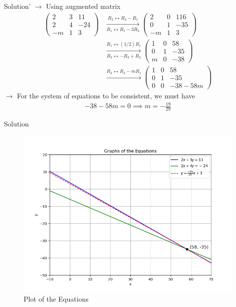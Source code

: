 \documentclass{beamer}
\numberwithin{equation}{section}
\theoremstyle{remark}
\begin{document}
\begin{frame}{Solution}'
$\rightarrow$ Using augmented matrix
\begin{align}
    \left(\begin{array}{cc|c}2&3&11\\2&4&-24\\-m&1&3\end{array}\right)
    &\xrightarrow[R_1 \leftrightarrow R_1 - 3R_2]{R_2 \leftrightarrow R_2 - R_1} \left(\begin{array}{cc|c}2&0&116\\0&1&-35\\-m&1&3\end{array}\right) \\
    &\xrightarrow[R_3 \leftrightarrow -R_3 + R_2]{R_1 \leftrightarrow (1/2)R_1}
    \left(\begin{array}{cc|c}1&0&58\\0&1&-35\\m&0&-38\end{array}\right) \\
    &\xrightarrow{R_3 \leftrightarrow R_3 - mR_1}
    \left(\begin{array}{cc|c}1&0&58\\0&1&-35\\0&0&-38-58m\end{array}\right)
\end{align}
$\rightarrow$ For the system of equations to be consistent, we must have
\begin{align}
    -38-58m = 0 \implies m = -\frac{19}{29}
\end{align}
\end{frame}

\begin{frame}{Solution}
\begin{figure}[h!]
   \centering
   \includegraphics[width=0.85\linewidth]{figs/01.png}
   \caption{Plot of the Equations}
   \label{Plot_1}
\end{figure}
\end{frame}
\end{document}
